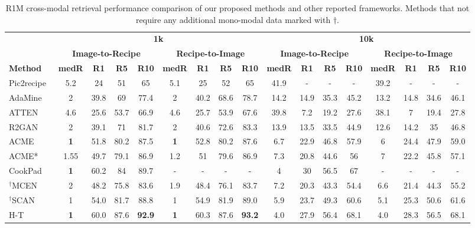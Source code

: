 \documentclass[sigconf,nonacm]{acmart}
\begin{document}
\begin{table*}[!ht]
\centering
  \small
  \caption{R1M cross-modal retrieval performance comparison of our proposed methods and other reported frameworks. Methods that not require any additional mono-modal data marked with $\dagger$.}
  \begin{tabular}{l|cccc|cccc|cccc|cccc}
\toprule
	 & \multicolumn{8}{c|}{\textbf{1k}} & \multicolumn{8}{c}{\textbf{10k}}    \\ \cmidrule{2-17}
	 & \multicolumn{4}{c|}{\textbf{Image-to-Recipe}} & \multicolumn{4}{c|}{\textbf{Recipe-to-Image}}& \multicolumn{4}{c|}{\textbf{Image-to-Recipe}} & \multicolumn{4}{c}{\textbf{Recipe-to-Image}}   \\  \cmidrule{1-17}
	\textbf{Method} & \textbf{medR} & \textbf{R1} & \textbf{R5} & \textbf{R10} & \textbf{medR} & \textbf{R1} & \textbf{R5} & \textbf{R10} & \textbf{medR} & \textbf{R1} & \textbf{R5} & \textbf{R10}& \textbf{medR} & \textbf{R1} & \textbf{R5} & \textbf{R10}  \\ 
	\midrule
	Pic2recipe~\cite{salvador2017} & 5.2 & 24 & 51 & 65 & 5.1 & 25 & 52 & 65 & 41.9 & - & - & - & 39.2 & - & - & -  \\ 
	AdaMine~\cite{carvalho2018} & 2 & 39.8 & 69 & 77.4 & 2 & 40.2 & 68.6 & 78.7 & 14.2 & 14.9 & 35.3 & 45.2 & 13.2 & 14.8 & 34.6 & 46.1 \\ 
	ATTEN~\cite{chen2018} & 4.6 & 25.6 & 53.7 & 66.9 & 4.6 & 25.7 & 53.9 & 67.6 & 39.8 & 7.2 & 19.2 & 27.6 & 38.1 & 7 & 19.4 & 27.8 \\ 
	R2GAN~\cite{Zhu2019} & 2 & 39.1 & 71 & 81.7 & 2 & 40.6 & 72.6 & 83.3 & 13.9 & 13.5 & 33.5 & 44.9 & 12.6 & 14.2 & 35 & 46.8 \\ 
	ACME~\cite{wang2019} & \textbf{1} & 51.8 & 80.2 & 87.5 & \textbf{1} & 52.8 & 80.2 & 87.6 & 6.7 & 22.9 & 46.8 & 57.9 & 6 & 24.4 & 47.9 & 59.0 \\ 
	ACME* & 1.55 & 49.7 & 79.1 & 86.9 & 1.2 & 51 & 79.6 & 86.9 & 7.3 & 20.8 & 44.6 & 56 & 7 & 22.2 & 45.8 & 57.1 \\ 
	CookPad~\cite{Fain2019} & \textbf{1} & 60.2 & 84 & 89.7 & - & - & - & - & 4 & 30 & 56.5 & 67 & - & - & - & - \\ 
	$^\dagger$MCEN~\cite{Fu2020} & 2 & 48.2 & 75.8 & 83.6 & 1.9 & 48.4 & 76.1 & 83.7  & 7.2	& 20.3	& 43.3	& 54.4	& 6.6	& 21.4	& 44.3	& 55.2 \\ 
	$^\dagger$SCAN~\cite{wang2020} & 1 & 54.0 & 81.7 & 88.8 & 1 & 54.9 & 81.9 & 89.0 & 5.9 & 23.7 & 49.3 & 60.6 & 5.1 & 25.3 & 50.6 & 61.6  \\ 
	H-T~\cite{salvador2021} & \textbf{1} & 60.0 & 87.6 & \textbf{92.9} &\textbf{1} & 60.3 & 87.6 & \textbf{93.2}  & 4.0	& 27.9	& 56.4	& 68.1	& 4.0	& 28.3	& 56.5	& 68.1 \\ \hline

\end{tabular}
\end{table*}
\end{document}
